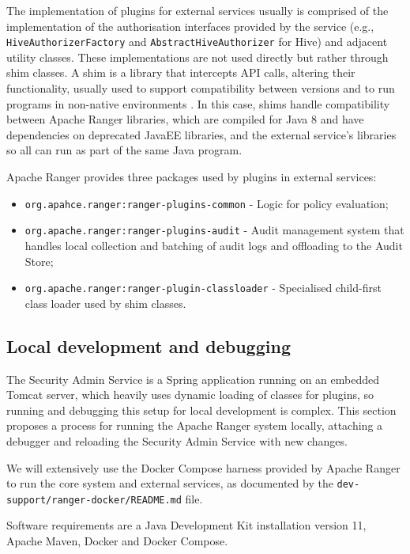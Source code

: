 The implementation of plugins for external services usually is comprised of the implementation of the authorisation interfaces provided by the service (e.g., \texttt{HiveAuthorizerFactory} and \texttt{AbstractHiveAuthorizer} for Hive) and adjacent utility classes. These implementations are not used directly but rather through shim classes. A shim is a library that intercepts API calls, altering their functionality, usually used to support compatibility between versions and to run programs in non-native environments \cite{shimsNewton2011}. In this case, shims handle compatibility between Apache Ranger libraries, which are compiled for Java 8 and have dependencies on deprecated JavaEE libraries, and the external service's libraries so all can run as part of the same Java program.

Apache Ranger provides three packages used by plugins in external services:

\begin{itemize}
    \item \texttt{org.apahce.ranger:ranger-plugins-common} - Logic for policy evaluation;
    \item \texttt{org.apache.ranger:ranger-plugins-audit} - Audit management system that handles local collection and batching of audit logs and offloading to the Audit Store;
    \item \texttt{org.apache.ranger:ranger-plugin-classloader} - Specialised child-first class loader used by shim classes.
\end{itemize}

\subsection{Local development and debugging}

The Security Admin Service is a Spring application running on an embedded Tomcat server, which heavily uses dynamic loading of classes for plugins, so running and debugging this setup for local development is complex. This section proposes a process for running the Apache Ranger system locally, attaching a debugger and reloading the Security Admin Service with new changes.

We will extensively use the Docker Compose harness provided by Apache Ranger to run the core system and external services, as documented by the \texttt{dev-support/ranger-docker/README.md} file.

Software requirements are a Java Development Kit installation version 11, Apache Maven, Docker and Docker Compose. 

